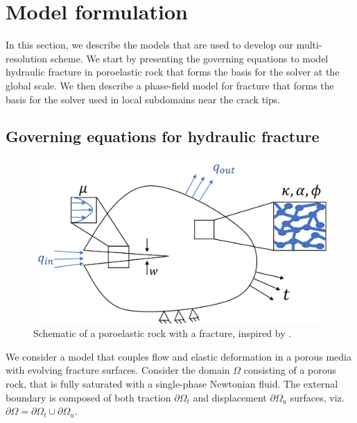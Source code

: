 \section{Model formulation}\label{formulation}

In this section, we describe the models that are used to develop our multi-resolution scheme.  We start by presenting the governing equations to model hydraulic fracture in poroelastic rock that forms the basis for the solver at the global scale.  We then describe a phase-field model for fracture that forms the basis for the solver used in local subdomains near the crack tips.

\subsection{Governing equations for hydraulic fracture}

\begin{figure}[h]
    \centering
    \includegraphics[width=15cm]{img/HF_potato_regular.png}
    \caption{Schematic of a poroelastic rock with a fracture, inspired by \cite{landis2016birs}.}
    \label{fig:potato_rock}
\end{figure}

We consider a model that couples flow and elastic deformation in a porous media with evolving fracture surfaces.  Consider the domain $\Omega$ consisting of a porous rock, that is fully saturated with a single-phase Newtonian fluid. The external boundary is composed of both traction $\partial \Omega_t$ and displacement $\partial \Omega_u$ surfaces, viz.\  $\partial \Omega = \partial \Omega_t \cup \partial \Omega_u$. 

